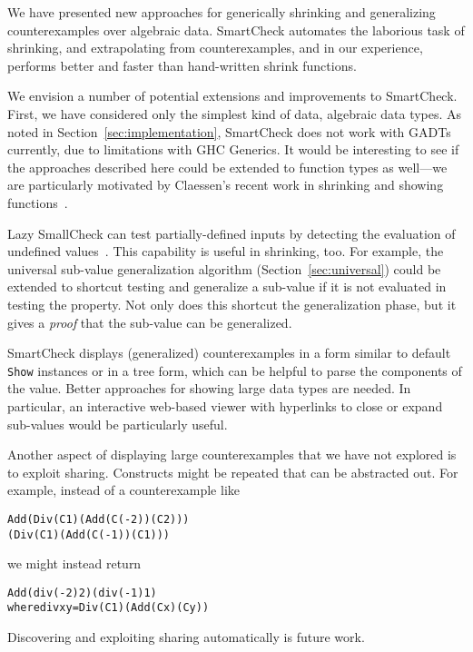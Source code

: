 \documentclass{sigplanconf}
\newenvironment{code}{\begin{alltt}\footnotesize}{\end{alltt}}
\newcommand{\ttp}[1]{\texttt{#1}}
\begin{document}
We have presented new approaches for generically shrinking and generalizing
counterexamples over algebraic data.  SmartCheck automates the laborious
task of shrinking, and extrapolating from counterexamples, and in our
experience, performs better and faster than hand-written shrink functions.

We envision a number of potential extensions and improvements to SmartCheck.
First, we have considered only the simplest kind of data, algebraic data types.
As noted in Section~\ref{sec:implementation}, SmartCheck does not work with
GADTs currently, due to limitations with GHC Generics.  It would be interesting
to see if the approaches described here could be extended to function types as
well---we are particularly motivated by Claessen's recent work in shrinking and
showing functions~\cite{claessen}.

Lazy SmallCheck can test partially-defined inputs by detecting the evaluation of
undefined values~\cite{sc}.  This capability is useful in shrinking, too.  For
example, the universal sub-value generalization algorithm
(Section~\ref{sec:universal}) could be extended to shortcut testing and
generalize a sub-value if it is not evaluated in testing the property.  Not only
does this shortcut the generalization phase, but it gives a \emph{proof} that the
sub-value can be generalized.

SmartCheck displays (generalized) counterexamples in a form similar to default
\ttp{Show} instances or in a tree form, which can be helpful to parse the
components of the value.  Better approaches for showing large data types are
needed.  In particular, an interactive web-based viewer with hyperlinks to close
or expand sub-values would be particularly useful.

Another aspect of displaying large counterexamples that we have not explored is
to exploit sharing.  Constructs might be repeated that can be abstracted out.
For example, instead of a counterexample like
%
\begin{code}
Add (Div (C 1) (Add (C (-2)) (C 2)))
    (Div (C 1) (Add (C (-1)) (C 1)))
\end{code}
%
\noindent
we might instead return
%
\begin{code}
Add (div (-2) 2) (div (-1) 1)
  where div x y = Div (C 1) (Add (C x) (C y))
\end{code}
%
\noindent
Discovering and exploiting sharing automatically is future work.

\end{document}
